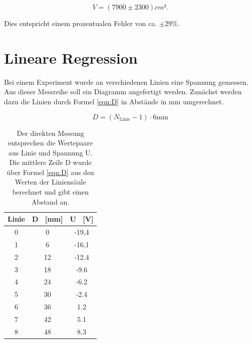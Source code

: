 \documentclass[titlepage = firstcover]{scrartcl}
\begin{document}
            \begin{equation*}
                V = (7900 \pm 2300) cm³ .
            \end{equation*}

            \noindent Dies entspricht einem prozentualen Fehler von ca. $\pm 29 \% $.

    
    \newpage
    \section{Lineare Regression}
        Bei einem Experiment wurde an verschiedenen Linien eine Spannung gemessen. Aus dieser Messreihe soll ein Diagramm angefertigt werden. Zunächst werden 
        dazu die Linien durch Formel \ref{eqn:D} in Abstände in mm umgerechnet.

        \begin{equation}
            D = (N_{\text{Linie}}-1) \cdot 6 \text{mm}
            \label{eqn:D}
        \end{equation}
        
        \begin{table}[h]
            \centering
            \label{tab:Messwerte}
            \begin{tabular}{c c c}
                \toprule
                {Linie} & {D \ [mm]} & {U \ [V]} \\
                \midrule
                0       & 0          & -19,4     \\
                1       & 6          & -16,1     \\
                2       & 12         & -12.4     \\
                3       & 18         & -9.6      \\
                4       & 24         & -6.2      \\
                5       & 30         & -2.4      \\
                6       & 36         & 1.2       \\
                7       & 42         & 5.1       \\
                8       & 48         & 8.3       \\
                \bottomrule                
            \end{tabular}
            \caption{Der direkten Messung entsprechen die Wertepaare aus Linie und Spannung U. Die mittlere Zeile D wurde über Formel \ref{eqn:D} aus den Werten der Liniensäule berechnet und gibt einen Abstand an.}
        \end{table}
        
\end{document}
